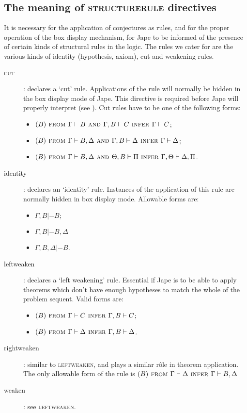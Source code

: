 \subsection{The meaning of \textsc{structurerule} directives}
\label{sec:paraformlang:structurerules}
It is necessary for the application of conjectures as rules, and for the proper operation of the box display mechanism, for Jape to be informed of the presence of certain kinds of structural rules in the logic. The rules we cater for are the various kinds of identity (hypothesis, axiom), cut and weakening rules.

\begin{description}
\item[\textsc{cut}]: declares a `cut' rule. Applications of the rule will normally be hidden in the box display mode of Jape. This directive is required before Jape will properly interpret  (see ). Cut rules have to be one of the following forms: 
\begin{itemize}
\item $(B) \textsc{ from } \Gamma |- B \textsc{ and } \Gamma, B |- C \textsc{ infer } \Gamma |- C$; 
\item $(B) \textsc{ from } \Gamma |- B, \Delta \textsc{ and } \Gamma, B |- \Delta \textsc{ infer } \Gamma |- \Delta$;
\item $(B) \textsc{ from } \Gamma |- B, \Delta \textsc{ and } \Theta, B |- \Pi \textsc{ infer } \Gamma, \Theta |- \Delta, \Pi$.
\end{itemize}

\item[identity]: declares an `identity' rule. Instances of the application of this rule are normally hidden in box display mode. Allowable forms are:
\begin{itemize}
\item $\Gamma, B |- B$;
\item $\Gamma, B |- B, \Delta$
\item $\Gamma, B, \Delta |- B$.
\end{itemize}

\item[leftweaken]: declares a `left weakening' rule. Essential if Jape is to be able to apply theorems which don't have enough hypotheses to match the whole of the problem sequent. Valid forms are:
\begin{itemize}
\item $(B) \textsc{ from } \Gamma |- C \textsc{ infer } \Gamma, B |- C$;
\item $(B) \textsc{ from } \Gamma |- \Delta \textsc{ infer } \Gamma, B |- \Delta$.
\end{itemize}

\item[rightweaken]: similar to \textsc{leftweaken}, and plays a similar r\^{o}le in theorem application. The only allowable form of the rule is $(B) \textsc{ from } \Gamma |- \Delta \textsc{ infer } \Gamma |- B, \Delta$

\item[weaken]: see \textsc{leftweaken}.

\end{description}

